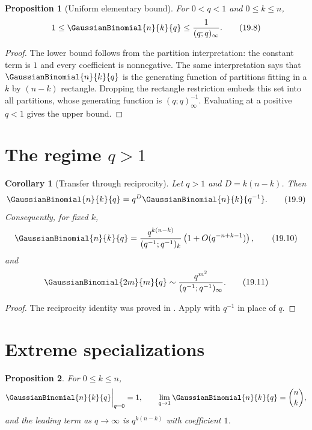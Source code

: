 \documentclass[11pt,a4paper,oneside,openany]{book}
\newtheorem{proposition}[proposition]{Proposition}
\newtheorem{corollary}[corollary]{Corollary}
\theoremstyle{definition}
\theoremstyle{remark}
\begin{document}
\begin{proposition}[Uniform elementary bound]\label{prop:gaussian-bound}
For $0<q<1$ and $0\le k\le n$,
\[
 1\le\GaussianBinomial{n}{k}{q}\le\frac1{(q;q)_\infty}.
 \tag{19.8}\label{eq:gaussian-bound}
\]
\end{proposition}

\begin{proof}
The lower bound follows from the partition interpretation: the constant term is $1$ and every coefficient is nonnegative.  The same interpretation says that $\GaussianBinomial{n}{k}{q}$ is the generating function of partitions fitting in a $k$ by $(n-k)$ rectangle.  Dropping the rectangle restriction embeds this set into all partitions, whose generating function is $(q;q)_\infty^{-1}$.  Evaluating at a positive $q<1$ gives the upper bound.
\end{proof}

\section{The regime \texorpdfstring{$q>1$}{q greater than 1}}

\begin{corollary}[Transfer through reciprocity]\label{cor:qgreaterone}
Let $q>1$ and $D=k(n-k)$.  Then
\[
 \GaussianBinomial{n}{k}{q}=q^D\GaussianBinomial{n}{k}{q^{-1}}.
 \tag{19.9}\label{eq:qgreaterone-reciprocity}
\]
Consequently, for fixed $k$,
\[
 \GaussianBinomial{n}{k}{q}
 =\frac{q^{k(n-k)}}{(q^{-1};q^{-1})_k}
 \left(1+O(q^{-n+k-1})\right),
 \tag{19.10}\label{eq:qgreaterone-fixed-k}
\]
and
\[
 \GaussianBinomial{2m}{m}{q}
 \sim\frac{q^{m^2}}{(q^{-1};q^{-1})_\infty}.
 \tag{19.11}\label{eq:qgreaterone-central}
\]
\end{corollary}

\begin{proof}
The reciprocity identity was proved in .  Apply  with $q^{-1}$ in place of $q$.
\end{proof}

\section{Extreme specializations}

\begin{proposition}\label{prop:extreme-specializations}
For $0\le k\le n$,
\[
 \GaussianBinomial{n}{k}{q}\bigg|_{q=0}=1,
 \qquad
 \lim_{q\to1}\GaussianBinomial{n}{k}{q}=\binom nk,
\]
and the leading term as $q\to\infty$ is $q^{k(n-k)}$ with coefficient $1$.
\end{proposition}
\end{document}
